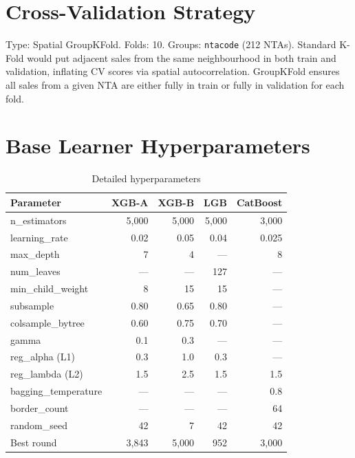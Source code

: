 \documentclass[11pt, a4paper, twoside]{report}
\begin{document}
\section{Cross-Validation Strategy}
Type: Spatial GroupKFold. Folds: 10. Groups: \texttt{ntacode} (212 NTAs).
Standard K-Fold would put adjacent sales from the same neighbourhood in both
train and validation, inflating CV scores via spatial autocorrelation.
GroupKFold ensures all sales from a given NTA are either fully in train or
fully in validation for each fold.

\section{Base Learner Hyperparameters}
\begin{table}[H]
  \centering
  \caption{Detailed hyperparameters}
  \begin{tabular}{lrrrr}
    \toprule
    Parameter & XGB-A & XGB-B & LGB & CatBoost \\
    \midrule
    n\_estimators         & 5,000 & 5,000 & 5,000 & 3,000 \\
    learning\_rate        & 0.02  & 0.05  & 0.04  & 0.025 \\
    max\_depth            & 7     & 4     & ---   & 8 \\
    num\_leaves           & ---   & ---   & 127   & --- \\
    min\_child\_weight    & 8     & 15    & 15    & --- \\
    subsample             & 0.80  & 0.65  & 0.80  & --- \\
    colsample\_bytree     & 0.60  & 0.75  & 0.70  & --- \\
    gamma                 & 0.1   & 0.3   & ---   & --- \\
    reg\_alpha (L1)       & 0.3   & 1.0   & 0.3   & --- \\
    reg\_lambda (L2)      & 1.5   & 2.5   & 1.5   & 1.5 \\
    bagging\_temperature  & ---   & ---   & ---   & 0.8 \\
    border\_count         & ---   & ---   & ---   & 64 \\
    random\_seed          & 42    & 7     & 42    & 42 \\
    Best round            & 3,843 & 5,000 & 952   & 3,000 \\
    \bottomrule
  \end{tabular}
\end{table}
\end{document}
